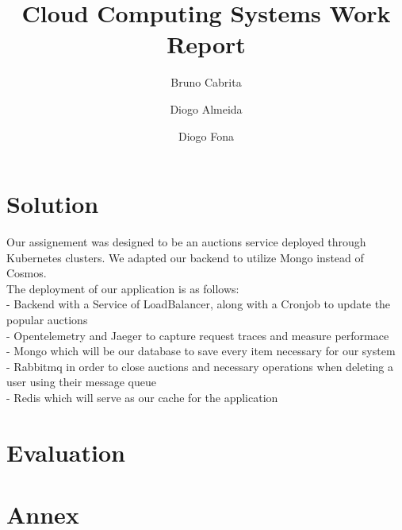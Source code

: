 \documentclass[runningheads]{llncs}
\begin{document}
%
\title{Cloud Computing Systems Work Report}
%
%
\author{Bruno Cabrita \and
Diogo Almeida \and
Diogo Fona}
%
%
%
\maketitle              %
%
\section{Solution}
Our assignement was designed to be an auctions service deployed through Kubernetes clusters. We adapted our backend to utilize
Mongo instead of Cosmos.
\\The deployment of our application is as follows:
\\- Backend with a Service of LoadBalancer, along with a Cronjob to update the popular auctions
\\- Opentelemetry and Jaeger to capture request traces and measure performace
\\- Mongo which will be our database to save every item necessary for our system
\\- Rabbitmq in order to close auctions and necessary operations when deleting a user using their message queue
\\- Redis which will serve as our cache for the application

\section{Evaluation}


\section{Annex}
\end{document}
